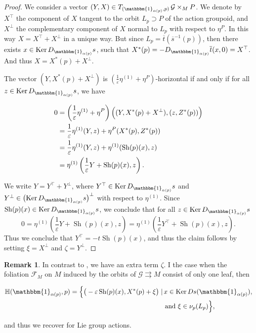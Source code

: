 \documentclass[12pt,a4paper,reqno]{amsart}
\DeclareMathOperator{\kernel}{Ker}
\DeclareMathOperator{\Sh}{Sh} %
\newcommand{\1}{\mathbbm{1}} %
\newcommand{\fol}{\mathcal{F}} %
\newcommand{\G}{\mathcal{G}} %
\newcommand{\Hor}{\mathbb{H}} %
\theoremstyle{definition}
\newtheorem{remark}[thm]{Remark}
\theoremstyle{TheoremNum}
\begin{document}
\begin{proof}
We consider a vector $(Y,X)\in T_{(\1_{\alpha(p)},p)}\, \G\times_M P$. We denote by $X^\top$ the component of $X$ tangent to the orbit $L_p\supset P$ of the action groupoid, and $X^\perp$ the complementary component of $X$ normal to $L_p$ with respect to $\eta^P$. In this way $X = X^\top+X^\perp$ in a unique way. But since $L_p = \overline{t}(\overline{s}^{-1}(p))$, then there exists $x\in \kernel D_{\1_{\alpha(p)}}s$, such that $X^\ast (p) = -D_{\1_{\alpha(p)}}\overline{t}(x,0) = X^\top$. And thus $X= X^\ast(p)+X^\perp$. 

The vector $(Y,X^\ast(p)+X^\perp)$ is $(\frac{1}{\varepsilon}\eta^{(1)}+\eta^P)$-horizontal if and only if for all $z\in \kernel D_{\1_{\alpha(p)}} s$, we have
\begin{linenomath}
\begin{align*}
0 &=  \left(\frac{1}{\varepsilon}\eta^{(1)}+\eta^P\right)\Bigl((Y,X^\ast(p)+X^\perp),(z,Z^\ast(p))\Bigr)\\
&= \frac{1}{\varepsilon}\eta^{(1)}(Y,z)+\eta^P(X^\ast(p),Z^\ast(p))\\
& = \frac{1}{\varepsilon}\eta^{(1)}(Y,z)+\eta^{(1)}(\Sh(p)(x),z)\\
&= \eta^{(1)}\left(\frac{1}{\varepsilon}Y+\Sh(p)(x),z\right).
\end{align*}
\end{linenomath}

We write $Y = Y^\top+Y^\perp$, where $Y^\top\in \kernel D_{\1_{\alpha(p)}}s$ and \linebreak$Y^\perp\in \bigl(\kernel D_{\1_{\alpha(p)}}s\bigr)^\perp$ with respect to $\eta^{(1)}$. Since $\Sh(p)(x)\in \kernel D_{\1_{\alpha(p)}}s$, we conclude that for all $z\in \kernel D_{\1_{\alpha(p)}}s$
\[
0=\eta^{(1)}\left(\frac{1}{\varepsilon}Y+\Sh(p)(x),z\right) = \eta^{(1)}\left(\frac{1}{\varepsilon}Y^\top+\Sh(p)(x),z\right).
\] 
Thus we conclude that $Y^\top = -t\Sh(p)(x)$, and thus the claim follows by setting $\xi = X^\perp$ and $\zeta = Y^\perp$.
\end{proof}

\begin{remark}
In contrast to \cite[Lemma~3.2 (b)]{Mueter}, we have an extra term $\zeta$. I the case when the foliation $\fol_M$ on $M$ induced by the orbits of $\G\rightrightarrows M$ consist of only one leaf, then 
\begin{linenomath}
\begin{align*}
\Hor(\1_{\alpha(p)},p) = \Big\{\big(-\varepsilon\Sh(p)(x),X^\ast(p)+\xi\big)\mid&\, x\in \kernel Ds(\1_{\alpha(p)}),\\
&\mbox{ and }\xi\in \nu_p(L_p)\Big\},
\end{align*}
\end{linenomath}
and thus we recover \cite[Lemma~3.2 (b)]{Mueter} for Lie  group actions.
\end{remark}
\end{document}
